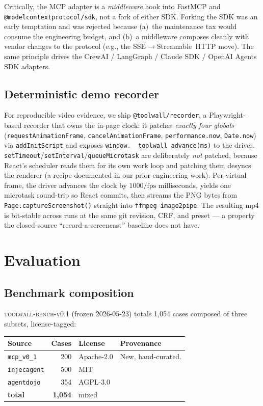 Critically, the MCP adapter is a \emph{middleware} hook into
FastMCP and \verb|@modelcontextprotocol/sdk|, not a fork of either
SDK. Forking the SDK was an early temptation and was rejected
because (a)~the maintenance tax would consume the engineering
budget, and (b)~a middleware composes cleanly with vendor changes
to the protocol (e.g., the SSE$\to$Streamable~HTTP move). The same
principle drives the CrewAI / LangGraph / Claude SDK / OpenAI
Agents SDK adapters.

\subsection{Deterministic demo recorder}

For reproducible video evidence, we ship \verb|@toolwall/recorder|,
a Playwright-based recorder that owns the in-page clock: it
patches \emph{exactly four globals}
(\verb|requestAnimationFrame|, \verb|cancelAnimationFrame|,
\verb|performance.now|, \verb|Date.now|) via \verb|addInitScript|
and exposes \verb|window.__toolwall_advance(ms)| to the driver.
\verb|setTimeout|/\verb|setInterval|/\verb|queueMicrotask| are
deliberately \emph{not} patched, because React's scheduler reads
them for its own work loop and patching them desyncs the
renderer (a recipe documented in our prior engineering work). Per
virtual frame, the driver advances the clock by $1000/\text{fps}$
milliseconds, yields one microtask round-trip so React commits,
then streams the PNG bytes from
\verb|Page.captureScreenshot()| straight into
\verb|ffmpeg image2pipe|. The resulting mp4 is bit-stable across
runs at the same git revision, CRF, and preset --- a property
the closed-source ``record-a-screencast'' baseline does not have.

\section{Evaluation}
\label{sec:eval}

\subsection{Benchmark composition}

\textsc{toolwall-bench-v0.1} (frozen 2026-05-23) totals 1{,}054
cases composed of three subsets, license-tagged:

\begin{center}
\begin{tabular}{lrll}
\toprule
Source & Cases & License & Provenance \\
\midrule
\verb|mcp_v0_1|   & 200   & Apache-2.0 & New, hand-curated. \\
\verb|injecagent| & 500   & MIT        & \cite{zhan2024injecagent} \\
\verb|agentdojo|  & 354   & AGPL-3.0   & \cite{debenedetti2024agentdojo} \\
\midrule
\textbf{total}    & \textbf{1{,}054} & mixed & \\
\bottomrule
\end{tabular}
\end{center}

